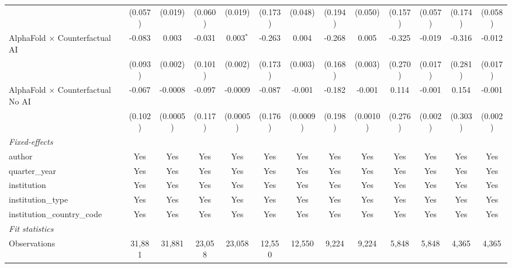 \begin{tabular}{lcccccccccccc}
                                            & (0.057)      & (0.019)  & (0.060) & (0.019)     & (0.173)      & (0.048)  & (0.194)      & (0.050)  & (0.157) & (0.057)     & (0.174) & (0.058)\\   
   AlphaFold $\times$ Counterfactual AI     & -0.083       & 0.003    & -0.031  & 0.003$^{*}$ & -0.263       & 0.004    & -0.268       & 0.005    & -0.325  & -0.019      & -0.316  & -0.012\\   
                                            & (0.093)      & (0.002)  & (0.101) & (0.002)     & (0.173)      & (0.003)  & (0.168)      & (0.003)  & (0.270) & (0.017)     & (0.281) & (0.017)\\   
   AlphaFold $\times$ Counterfactual No AI  & -0.067       & -0.0008  & -0.097  & -0.0009     & -0.087       & -0.001   & -0.182       & -0.001   & 0.114   & -0.001      & 0.154   & -0.001\\   
                                            & (0.102)      & (0.0005) & (0.117) & (0.0005)    & (0.176)      & (0.0009) & (0.198)      & (0.0010) & (0.276) & (0.002)     & (0.303) & (0.002)\\   
   \midrule
   \emph{Fixed-effects}\\
   author                                   & Yes          & Yes      & Yes     & Yes         & Yes          & Yes      & Yes          & Yes      & Yes     & Yes         & Yes     & Yes\\  
   quarter\_year                            & Yes          & Yes      & Yes     & Yes         & Yes          & Yes      & Yes          & Yes      & Yes     & Yes         & Yes     & Yes\\  
   institution                              & Yes          & Yes      & Yes     & Yes         & Yes          & Yes      & Yes          & Yes      & Yes     & Yes         & Yes     & Yes\\  
   institution\_type                        & Yes          & Yes      & Yes     & Yes         & Yes          & Yes      & Yes          & Yes      & Yes     & Yes         & Yes     & Yes\\  
   institution\_country\_code               & Yes          & Yes      & Yes     & Yes         & Yes          & Yes      & Yes          & Yes      & Yes     & Yes         & Yes     & Yes\\  
   \midrule
   \emph{Fit statistics}\\
   Observations                             & 31,881       & 31,881   & 23,058  & 23,058      & 12,550       & 12,550   & 9,224        & 9,224    & 5,848   & 5,848       & 4,365   & 4,365\\  

\end{tabular}
